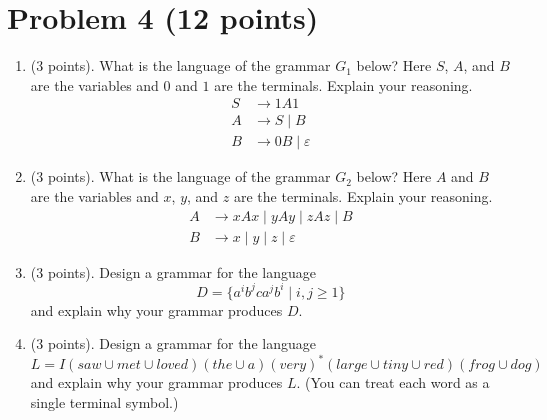 \documentclass[letterpaper,11pt,twoside]{article}
\theoremstyle{plain}
\theoremstyle{definition}
\theoremstyle{remark}
\theoremstyle{restate}
\begin{document}
    
    
\clearpage
\section{Problem 4 (12 points)}
    \begin{enumerate}
        \item (3 points). What is the language of the grammar $G_1$ below? Here $S$, $A$, and $B$ are the variables and $0$ and $1$ are the terminals. Explain your reasoning.
        \begin{align*}
            S &\rightarrow 1A1 \\
            A &\rightarrow S \; | \; B \\
            B &\rightarrow 0B \; | \; \varepsilon
        \end{align*}
        
        \item (3 points). What is the language of the grammar $G_2$ below? Here $A$ and $B$ are the variables and $x$, $y$, and $z$ are the terminals. Explain your reasoning.
        \begin{align*}
            A &\rightarrow xAx \; | \; yAy \; | \; zAz \; | \; B \\
            B &\rightarrow x \; | \; y \; | \; z \; | \; \varepsilon
        \end{align*}
        
        \item (3 points). Design a grammar for the language
        \[
            D = \{a^i b^j c a^j b^i \; | \; i, j \geq 1\}
        \]
        and explain why your grammar produces $D$.
        
        \item (3 points). Design a grammar for the language
        \[
            L = I(saw \cup met \cup loved)(the \cup a)(very)^*(large \cup tiny \cup red)(frog \cup dog)
        \]
        and explain why your grammar produces $L$. (You can treat each word as a single terminal symbol.)
    \end{enumerate}
\end{document}
